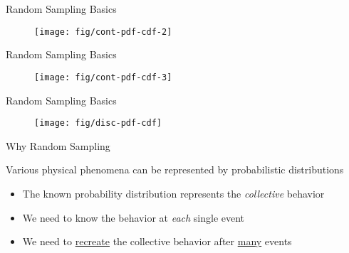 \documentclass[xcolor=x11names,compress]{beamer}
\renewcommand{\(}{\begin{columns}}
\renewcommand{\)}{\end{columns}}
\newcommand{\<}[1]{\begin{column}{#1}}
\renewcommand{\>}{\end{column}}
\begin{document}
\begin{frame}{Random Sampling Basics}

  	\begin{figure}
  	\begin{center}
  		\texttt{[image: fig/cont-pdf-cdf-2]}
	\end{center}
  	\end{figure}

\end{frame}

\begin{frame}{Random Sampling Basics}

  	\begin{figure}
  	\begin{center}
  		\texttt{[image: fig/cont-pdf-cdf-3]}
	\end{center}
  	\end{figure}

\end{frame}

\begin{frame}{Random Sampling Basics}

  	\begin{figure}
  	\begin{center}
  		\texttt{[image: fig/disc-pdf-cdf]}
	\end{center}
  	\end{figure}

\end{frame}


\begin{frame}{Why Random Sampling}

Various physical phenomena can be
represented by probabilistic distributions

\begin{itemize}
    \item The known probability distribution
represents the \textit{collective} behavior
\vspace*{1em}
    \item We need to know the behavior at \textit{each}
single event
\vspace*{1em}
    \item We need to \underline{recreate} the collective behavior after \underline{many} events
\end{itemize}

\end{frame}
\end{document}
